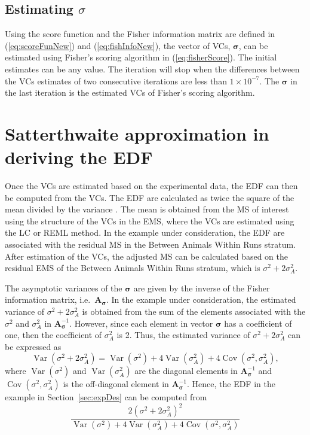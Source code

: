 \documentclass[12pt,a4paper]{article}
\newcommand{\A}{\mathbf{A}}
\begin{document}
\subsection{Estimating {\boldmath $\sigma$}}
Using the score function and the Fisher information matrix are defined in (\ref{eq:scoreFunNew}) and (\ref{eq:fishInfoNew}), the vector of VCs, $\bm{\sigma}$, can be estimated using Fisher's scoring algorithm in (\ref{eq:fisherScore}). The initial estimates can be any value. The iteration will stop when the differences between the VCs estimates of two consecutive iterations are less than $1 \times 10^{-7}$. The $\bm{\sigma}$ in the last iteration is the estimated VCs of Fisher's scoring algorithm.

\section{Satterthwaite approximation in deriving the EDF}
\label{sec:estEDF}
Once the VCs are estimated based on the experimental data, the EDF can then be computed from the VCs. The EDF are calculated as twice the square of the mean divided by the variance \citep{Satterthwaite1946, Jarrett2008}. The mean is obtained from the MS of interest using the structure of the VCs in the EMS, where the VCs are estimated using the LC or REML method. In the example under consideration, the EDF are associated with the residual MS in the Between Animals Within Runs stratum. After estimation of the VCs, the adjusted MS can be calculated based on the residual EMS of the Between Animals Within Runs stratum, which is $\sigma^2 + 2\sigma_A^2$.
 
The asymptotic variances of the $\bm{\sigma}$ are given by the inverse of the Fisher information matrix, i.e.\ $\A_{\bm{\sigma}}$. In the example under consideration, the estimated variance of $\sigma^2 + 2\sigma_A^2$ is obtained from the sum of the elements associated with the $\sigma^2$ and $\sigma_A^2$ in $\A^{-1}_{\bm{\sigma}}.$ However, since each element in vector $\bm{\sigma}$ has a coefficient of one, then the coefficient of $\sigma_A^2$ is 2. Thus, the estimated variance of $\sigma^2 + 2\sigma_A^2$ can be expressed as  
\[ \operatorname{Var}(\sigma^2 + 2\sigma_A^2) = \operatorname{Var}(\sigma^2) + 4\operatorname{Var}(\sigma_A^2) + 4\operatorname{Cov}(\sigma^2,\sigma_A^2),\] where $\operatorname{Var}(\sigma^2)$ and $\operatorname{Var}(\sigma_A^2)$ are the diagonal elements in $\A^{-1}_{\bm{\sigma}}$ and $\operatorname{Cov}(\sigma^2,\sigma_A^2)$ is the off-diagonal element in $\A^{-1}_{\bm{\sigma}}$. Hence, the EDF in the example in Section~\ref{sec:expDes} can be computed from 
\[\dfrac{2(\sigma^2 + 2\sigma_A^2)^2}{\operatorname{Var}(\sigma^2) + 4\operatorname{Var}(\sigma_A^2) + 4\operatorname{Cov}(\sigma^2,\sigma_A^2)}\]
\end{document}
